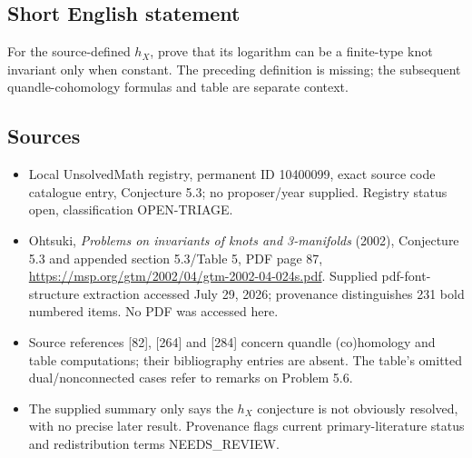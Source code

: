 \documentclass[11pt]{article}
\begin{document}
\subsection{Short English statement}
For the source-defined $h_X$, prove that its logarithm can be a finite-type knot invariant only when constant. The preceding definition is missing; the subsequent quandle-cohomology formulas and table are separate context.
\subsection{Sources}
\begin{itemize}
\item Local UnsolvedMath registry, permanent ID 10400099, exact source code catalogue entry, Conjecture 5.3; no proposer/year supplied. Registry status open, classification OPEN-TRIAGE.
\item Ohtsuki, \emph{Problems on invariants of knots and 3-manifolds} (2002), Conjecture 5.3 and appended section 5.3/Table 5, PDF page 87, \url{https://msp.org/gtm/2002/04/gtm-2002-04-024s.pdf}. Supplied pdf-font-structure extraction accessed July 29, 2026; provenance distinguishes 231 bold numbered items. No PDF was accessed here.
\item Source references [82], [264] and [284] concern quandle (co)homology and table computations; their bibliography entries are absent. The table's omitted dual/nonconnected cases refer to remarks on Problem 5.6.
\item The supplied summary only says the $h_X$ conjecture is not obviously resolved, with no precise later result. Provenance flags current primary-literature status and redistribution terms NEEDS\_REVIEW.
\end{itemize}
\end{document}
